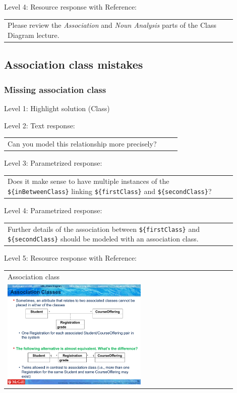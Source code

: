 \noindent Level 4: Resource response with Reference: \medskip

\begin{tabular}{|p{0.9\linewidth}}
Please review the \textit{Association} and \textit{Noun Analysis} parts of the Class Diagram lecture.
\end{tabular} \medskip


\subsection{Association class mistakes}

\subsubsection{Missing association class}

\noindent Level 1: Highlight solution (Class) \medskip

\noindent Level 2: Text response: \medskip

\begin{tabular}{|p{0.9\linewidth}}
Can you model this relationship more precisely?
\end{tabular} \medskip

\noindent Level 3: Parametrized response: \medskip

\begin{tabular}{|p{0.9\linewidth}}
Does it make sense to have multiple instances of the \verb|${inBetweenClass}| linking \verb|${firstClass}| and \verb|${secondClass}|?
\end{tabular} \medskip

\noindent Level 4: Parametrized response: \medskip

\begin{tabular}{|p{0.9\linewidth}}
Further details of the association between \verb|${firstClass}| and \verb|${secondClass}| should be modeled with an association class.
\end{tabular} \medskip

\noindent Level 5: Resource response with Reference: \medskip

\begin{tabular}{|p{0.9\linewidth}}
Association class

\\
\includegraphics[width=0.6\textwidth]{images/association_class.png}
\end{tabular} \medskip


